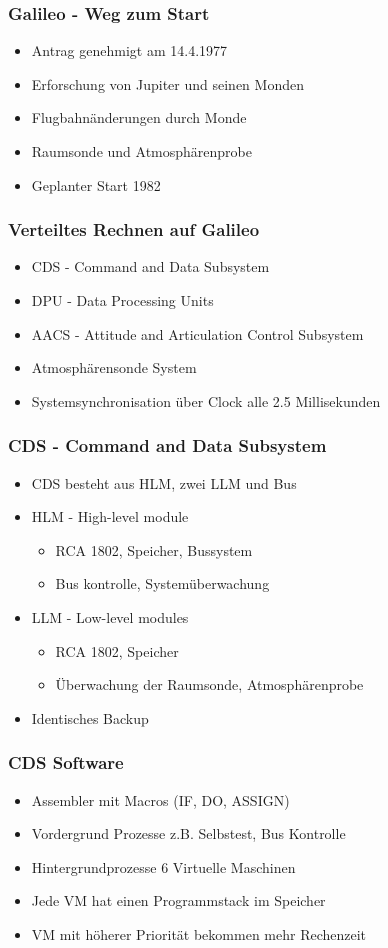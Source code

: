 
\begin{frame}
	\frametitle{Galileo - Weg zum Start}
	\begin{itemize}
		\item Antrag genehmigt am 14.4.1977
		\item Erforschung von Jupiter und seinen Monden
		\item Flugbahn\"anderungen durch Monde
		\item Raumsonde und Atmosph\"arenprobe
		\item Geplanter Start 1982
	\end{itemize}
\end{frame}


\begin{frame}
	\frametitle{Verteiltes Rechnen auf Galileo}
	\begin{itemize}
		\item CDS - Command and Data Subsystem
		\item DPU - Data Processing Units
		\item AACS - Attitude and Articulation Control Subsystem
		\item Atmosph\"arensonde System
		\item Systemsynchronisation über Clock alle 2.5 Millisekunden
	\end{itemize}
\end{frame}

\begin{frame}
	\frametitle{CDS - Command and Data Subsystem}
	\begin{itemize}
		\item CDS besteht aus HLM, zwei LLM und Bus
		\item HLM - High-level module
		\begin{itemize}
			\item RCA 1802, Speicher, Bussystem
			\item Bus kontrolle, System\"uberwachung
		\end{itemize}
		\item LLM - Low-level modules
		\begin{itemize}
			\item RCA 1802, Speicher
			\item \"Uberwachung der Raumsonde, Atmosph\"arenprobe
		\end{itemize}
		\item Identisches Backup
	\end{itemize}
\end{frame}

\begin{frame}
	\frametitle{CDS Software}
	\begin{itemize}
		\item Assembler mit Macros (IF, DO, ASSIGN)
		\item Vordergrund Prozesse z.B. Selbstest, Bus Kontrolle
		\item Hintergrundprozesse 6 Virtuelle Maschinen
		\item Jede VM hat einen Programmstack im Speicher
		\item VM mit höherer Priorität bekommen mehr Rechenzeit
	\end{itemize}
\end{frame}

